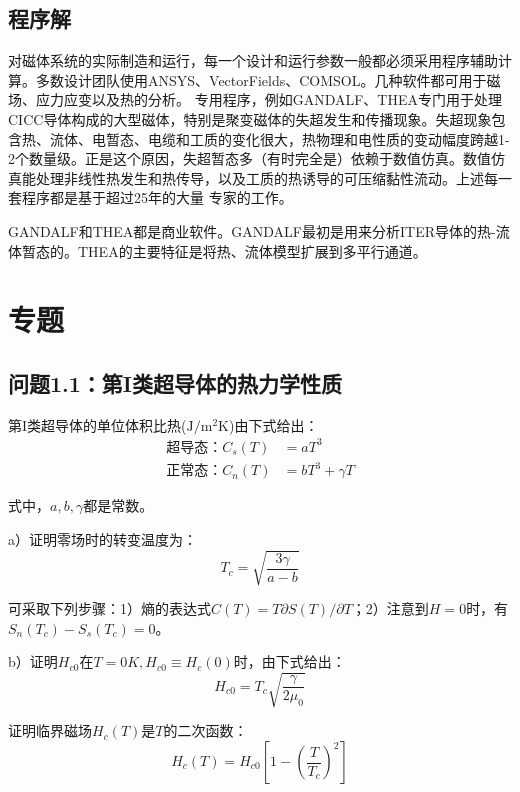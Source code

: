 \subsection{程序解}
对磁体系统的实际制造和运行，每一个设计和运行参数一般都必须采用程序辅助计算。多数设计团队使用ANSYS、VectorFields、COMSOL。几种软件都可用于磁场、应力应变以及热的分析。
专用程序，例如GANDALF、THEA专门用于处理CICC导体构成的大型磁体，特别是聚变磁体的失超发生和传播现象。失超现象包含热、流体、电暂态、电缆和工质的变化很大，热物理和电性质的变动幅度跨越1-2个数量级。正是这个原因，失超暂态多（有时完全是）依赖于数值仿真。数值仿真能处理非线性热发生和热传导，以及工质的热诱导的可压缩黏性流动。上述每一套程序都是基于超过25年的大量
专家的工作。

GANDALF和THEA都是商业软件。GANDALF最初是用来分析ITER导体的热-流体暂态的。THEA的主要特征是将热、流体模型扩展到多平行通道。

\section{专题}
\subsection{问题1.1：第I类超导体的热力学性质}
第I类超导体的单位体积比热($\mathrm{J/m^2K}$)由下式给出：
\begin{subequations}\label{eqn:1.4ab}
	\begin{align}
\mbox{超导态：} C_s(T) &= aT^3 \\
\mbox{正常态：} C_n(T)&= bT^3+\gamma T	
	\end{align}
\end{subequations}

式中，$a,b,\gamma$都是常数。

a）证明零场时的转变温度为：
\begin{equation}\label{eqn:1.5}
  T_c=\sqrt{\frac{3\gamma}{a-b}}
\end{equation}

可采取下列步骤：1）熵的表达式$C(T)=T\partial S(T)/\partial T$；2）注意到$H=0$时，有$S_n(T_c)-S_s(T_c)=0$。

b）证明$H_{c0}$在$T=0K, H_{c0}\equiv H_c(0)$时，由下式给出：
\begin{equation}\label{eqn:1.6}
  H_{c0}=T_c \sqrt{\frac{\gamma}{2\mu_0}}
\end{equation}

证明临界磁场$H_c(T)$是$T$的二次函数：
\begin{equation}\label{eqn:1.7}
  H_c(T)=H_{c0}\left[1-(\frac{T}{T_c})^2\right]
\end{equation}

